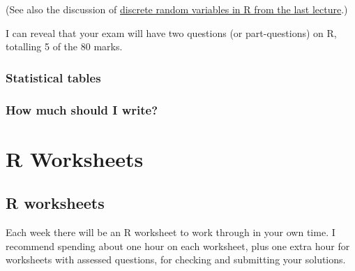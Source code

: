 \documentclass[
  letterpaper,
  DIV=11,
  numbers=noendperiod]{scrreprt}
\theoremstyle{remark}
\begin{document}
(See also the discussion of \protect\hyperlink{faq-R-RV}{discrete random
variables in R from the last lecture}.)

I can reveal that your exam will have two questions (or part-questions)
on R, totalling 5 of the 80 marks.

\hypertarget{statistical-tables-1}{%
\subsection{Statistical tables}\label{statistical-tables-1}}

\hypertarget{how-much-should-i-write}{%
\subsection{How much should I write?}\label{how-much-should-i-write}}

\hypertarget{R}{%
\chapter*{R Worksheets}\label{R}}


\hypertarget{r-work}{%
\section*{R worksheets}\label{r-work}}


Each week there will be an R worksheet to work through in your own time.
I recommend spending about one hour on each worksheet, plus one extra
hour for worksheets with assessed questions, for checking and submitting
your solutions.
\end{document}
